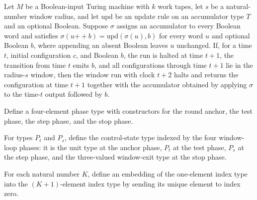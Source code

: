 \begin{theorem}
\label{Turing.windowRun_halts_on_last_transition}
\leanok
{}
Let $M$ be a Boolean-input Turing machine with $k$ work tapes, let $s$ be a
natural-number window radius, and let $\mathrm{upd}$ be an update rule on an accumulator
type $T$ and an optional Boolean. Suppose $\sigma$ assigns an accumulator to every
Boolean word and satisfies $\sigma(u\mathbin{++}b)=\mathrm{upd}(\sigma(u),b)$ for every
word $u$ and optional Boolean $b$, where appending an absent Boolean leaves $u$
unchanged. If, for a time $t$, initial configuration $c$, and Boolean $b$, the run is
halted at time $t+1$, the transition from time $t$ emits $b$, and all configurations
through time $t+1$ lie in the radius-$s$ window, then the window run with clock $t+2$
halts and returns the configuration at time $t+1$ together with the accumulator obtained
by applying $\sigma$ to the time-$t$ output followed by $b$.
\end{theorem}

\begin{definition}
\label{Turing.wl_Phase}
\leanok
Define a four-element phase type with constructors for the round anchor, the test phase,
the step phase, and the stop phase.
\end{definition}

\begin{definition}
\label{Turing.wl_Ctrl}
\leanok
{}
For types $P_t$ and $P_s$, define the control-state type indexed by the four window-loop
phases: it is the unit type at the anchor phase, $P_t$ at the test phase, $P_s$ at the
step phase, and the three-valued window-exit type at the stop phase.
\end{definition}

\begin{definition}
\label{Turing.wl_recordTape}
\leanok
For each natural number $K$, define an embedding of the one-element index type into the
$(K+1)$-element index type by sending its unique element to index zero.
\end{definition}

